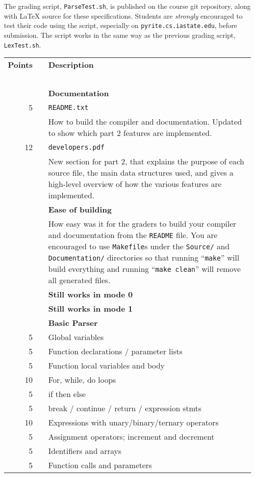 \documentclass{article}
\makeatletter
\newcommand{\gradeline}{ \cline{1-2} \cline{4-4} ~\\[-1.5ex] }
\newenvironment{gradetable}{\begin{longtable}{@{}rrcp{5in}} \multicolumn{2}{l}{\bf Points} & & {\bf Description}\\ \gradeline}{\end{longtable}}
\newcommand{\mainitem}[2]{\pagebreak[2] {\bf #1} &&& {\bf #2}}
\newcommand{\mainpara}[1]{~ &&& {#1} }
\newcommand{\inneritem}[2]{~ & #1 && #2}
\newcommand{\innerpara}[1]{~ & ~ && #1}
\newcommand{\thispart}{2}
\makeatother
\begin{document}
The grading script, {\tt ParseTest.sh}, is published on the course
git repository, along with \LaTeX{} source for these specifications.
Students are \emph{strongly} encouraged to test their code
using the script, especially on {\tt pyrite.cs.iastate.edu},
before submission.
The script works in the same way as the previous grading script,
{\tt LexTest.sh}.

\noindent
\begin{gradetable}
  \mainitem{17}{Documentation}
  \\[1mm]
  \inneritem{5}{\tt README.txt}
  \\[1mm]
  \innerpara{%
    How to build the compiler and documentation.
    Updated to show which part \thispart{} features are implemented.
  }
  \\[1mm]
  \inneritem{12}{\tt developers.pdf}
  \\[1mm]
  \innerpara{%
    New section for part \thispart{}, that explains
    the purpose of each source file,
    the main data structures used,
    and gives a high-level overview of how the various
    features are implemented.
  }
  \\[4mm]

  \mainitem{8}{Ease of building}
  \\[1mm]
  \mainpara{%
    How easy was it for the graders to build your compiler and
    documentation from the {\tt README} file.
		You are encouraged to use {\tt Makefile}s under the
		{\tt Source/} and {\tt Documentation/}
		directories so that running ``{\tt make}''
		will build everything and running ``{\tt make clean}''
		will remove all generated files.
  }
  \\[4mm]

  \mainitem{5}{Still works in mode 0}
  \\[4mm]
  \mainitem{5}{Still works in mode 1}
  \\[4mm]

  \mainitem{60}{Basic Parser}
  \\[2mm]
    \inneritem{5}{Global variables}
  \\
    \inneritem{5}{Function declarations / parameter lists}
  \\
    \inneritem{5}{Function local variables and body}
  \\[2mm]
    \inneritem{10}{For, while, do loops}
  \\
    \inneritem{5}{if then else}
  \\
    \inneritem{5}{break / continue / return / expression stmts}
  \\[2mm]
    \inneritem{10}{Expressions with unary/binary/ternary operators}
  \\
    \inneritem{5}{Assignment operators; increment and decrement}
  \\
    \inneritem{5}{Identifiers and arrays}
  \\
    \inneritem{5}{Function calls and parameters}
  \\[4mm]


\end{gradetable}
\end{document}

